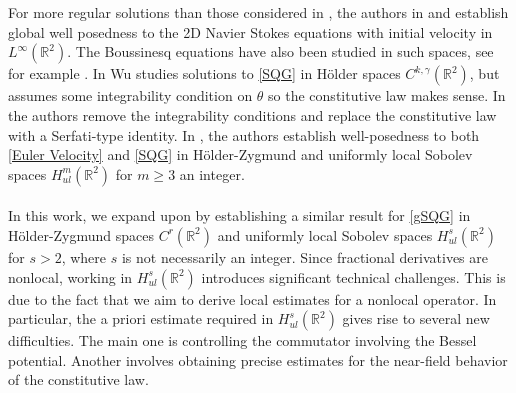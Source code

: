 \documentclass[12pt,xcolor=svgnames]{amsart}
\newcommand{\R}{\mathbb{R}}
\begin{document}
\\
\\
For more regular solutions than those considered in \cite{7}, the authors in \cite{14} and \cite{15} establish global well posedness to the 2D Navier Stokes equations with initial velocity in $L^{\infty}(\R^2)$. The Boussinesq equations have also been studied in such spaces, see for example \cite{16}. In \cite{5} Wu studies solutions to \eqref{SQG} in Hölder spaces $C^{k,\gamma}(\R^2)$, but assumes some integrability condition on $\theta$ so the constitutive law makes sense. In \cite{1} the authors remove the integrability conditions and replace the constitutive law with a Serfati-type identity. In \cite{1}, the authors establish well-posedness to both \eqref{Euler Velocity} and \eqref{SQG} in Hölder-Zygmund and uniformly local Sobolev spaces $H_{ul}^m(\R^2)$ for $m \geq 3$ an integer.\\
\\
In this work, we expand upon \cite{1} by establishing a similar result for \eqref{gSQG} in Hölder-Zygmund spaces \( C^r(\mathbb{R}^2) \) and uniformly local Sobolev spaces \( H^s_{ul}(\mathbb{R}^2) \) for \( s > 2 \), where \( s \) is not necessarily an integer. Since fractional derivatives are nonlocal, working in \( H^s_{ul}(\mathbb{R}^2) \) introduces significant technical challenges. This is due to the fact that we aim to derive local estimates for a nonlocal operator. In particular, the a priori estimate required in \( H^s_{ul}(\mathbb{R}^2) \) gives rise to several new difficulties. The main one is controlling the commutator involving the Bessel potential. Another involves obtaining precise estimates for the near-field behavior of the constitutive law.
\\
\\
\end{document}
